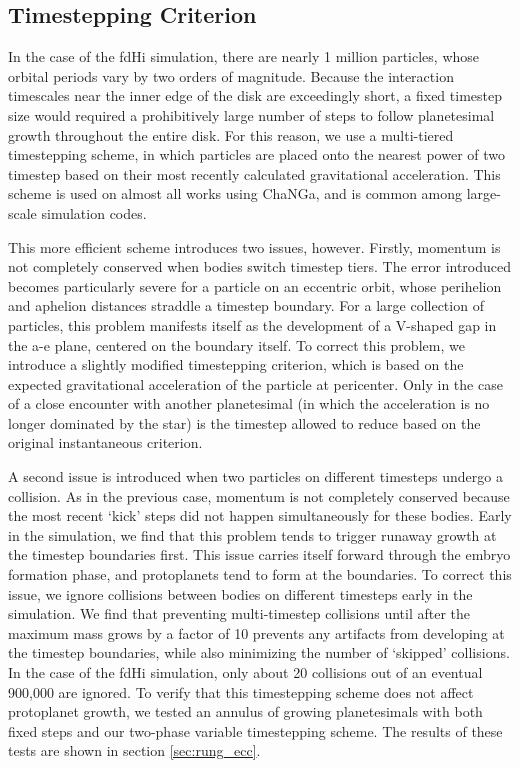\subsection{Timestepping Criterion}\label{sec:timestep}

In the case of the fdHi simulation, there are nearly 1 million
particles, whose orbital periods vary by two orders of magnitude. Because the
interaction timescales near the inner edge of the
disk are exceedingly short, a fixed timestep size would required a prohibitively large
number of steps to follow planetesimal growth throughout the entire
disk. For this reason, we use a multi-tiered timestepping scheme, in
which particles are placed onto the nearest power of two timestep
based on their most recently calculated gravitational
acceleration. This scheme is used on almost all works using ChaNGa,
and is common among large-scale simulation codes.

This more efficient scheme introduces two issues, however. Firstly,
momentum is not completely conserved when bodies switch timestep tiers. The
error introduced becomes particularly severe for a particle on an
eccentric orbit, whose perihelion and aphelion distances
straddle a timestep boundary. For a large collection of particles,
this problem manifests itself as the development of a V-shaped gap in the a-e plane, centered on the boundary itself. To correct this problem, we introduce a slightly modified timestepping criterion, which is based on the expected gravitational acceleration of the particle at pericenter. Only in the case of a close encounter with another planetesimal (in which the acceleration is no longer dominated by the star) is the timestep allowed to reduce based on the original instantaneous criterion.

A second issue is introduced when two particles on different timesteps
undergo a collision. As in the previous case, momentum is not
completely conserved because the most recent `kick' steps did not
happen simultaneously for these bodies. Early in the simulation, we
find that this problem tends to trigger runaway growth at the timestep
boundaries first. This issue carries itself forward through the embryo
formation phase, and protoplanets tend to form at the boundaries. To
correct this issue, we ignore collisions between bodies on different
timesteps early in the simulation. We find that preventing
multi-timestep collisions until after the maximum mass grows by a
factor of 10 prevents any artifacts from developing at the timestep
boundaries, while also minimizing the number of `skipped' collisions. In the case of the fdHi simulation, only about 20 collisions out of an eventual 900,000 are ignored. To verify that this timestepping scheme does not affect protoplanet growth, we tested an annulus of growing planetesimals with both fixed steps and our two-phase variable timestepping scheme. The results of these tests are shown in section \ref{sec:rung_ecc}.

